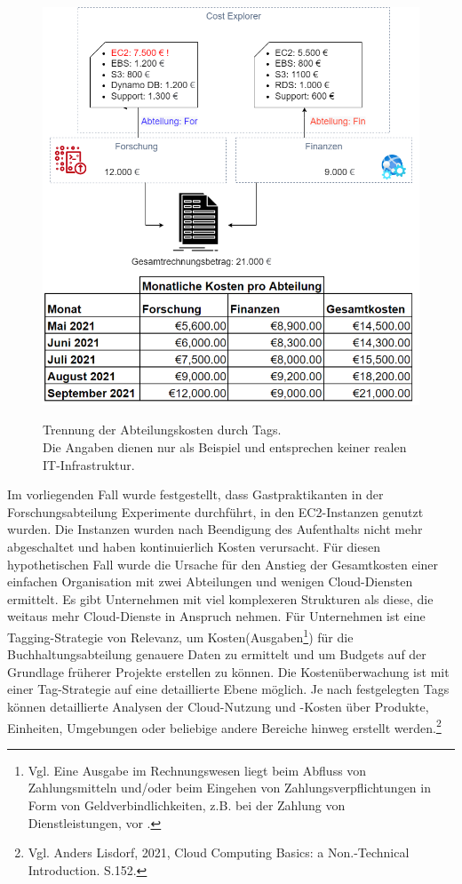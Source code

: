 \begin{figure}[h!]
  \centering
  \includegraphics[scale=0.5]{sources/BA Diagramme-Nach Abteilung.drawio}
  \caption[Trennung der Kosten durch Tags]{}
  \label{fig:BA Diagramme-Nach Abteilung.drawio} 
  Trennung der Abteilungskosten durch Tags.\\
  Die Angaben dienen nur als Beispiel und entsprechen keiner realen IT-Infrastruktur.
\end{figure} Im vorliegenden Fall wurde festgestellt, dass Gastpraktikanten in der Forschungsabteilung Experimente durchführt, in den EC2-Instanzen genutzt wurden. Die Instanzen wurden nach Beendigung des Aufenthalts nicht mehr abgeschaltet und haben kontinuierlich Kosten verursacht.
Für diesen hypothetischen Fall wurde die Ursache für den Anstieg der Gesamtkosten einer einfachen Organisation mit zwei Abteilungen und wenigen Cloud-Diensten ermittelt. Es gibt Unternehmen mit viel komplexeren Strukturen als diese, die weitaus mehr Cloud-Dienste in Anspruch nehmen. Für Unternehmen ist eine Tagging-Strategie von Relevanz, um Kosten(Ausgaben\footnote{Vgl. Eine Ausgabe im Rechnungswesen liegt beim Abfluss von Zahlungsmitteln und/oder beim Eingehen von Zahlungsverpflichtungen in Form von Geldverbindlichkeiten, z.B. bei der Zahlung von \\Dienstleistungen, vor \cite{AUS}.}) für die Buchhaltungsabteilung genauere Daten zu ermittelt und um Budgets auf der Grundlage früherer Projekte erstellen zu können. Die Kostenüberwachung ist mit einer Tag-Strategie auf eine detaillierte Ebene möglich. Je nach festgelegten Tags können detaillierte Analysen der Cloud-Nutzung und -Kosten über Produkte, Einheiten, Umgebungen oder beliebige andere Bereiche hinweg erstellt werden.\footnote{Vgl. Anders Lisdorf, 2021, Cloud Computing Basics: a Non.-Technical Introduction. S.152.\cite{CCB}}
